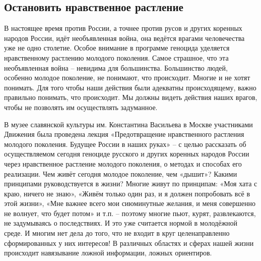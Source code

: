  
 
 
 
 
 
\subsection{Остановить нравственное растление}
\label{sec:19_05_2019.sites.ru.rusichi_info.1.ostanovit_nravstvennoje_rastlenije}

В настоящее время против России, а точнее против русов и других коренных
народов России, идёт необъявленная война, она ведётся врагами человечества уже
не одно столетие. Особое внимание в программе геноцида уделяется нравственному
растлению молодого поколения. Самое страшное, что эта необъявленная война –
невидима для большинства. Большинство людей, особенно молодое поколение, не
понимают, что происходит. Многие и не хотят понимать. Для того чтобы наши
действия были адекватны происходящему, важно правильно понимать, что
происходит. Мы должны видеть действия наших врагов, чтобы не позволять им
осуществлять задуманное. 

В музее славянской культуры им. Константина Васильева
в Москве участниками Движения была проведена лекция «Предотвращение
нравственного растления молодого поколения. Будущее России в наших руках» – с
целью рассказать об осуществляемом сегодня геноциде русского и других коренных
народов России через нравственное растление молодого поколения, о методах и
способах его реализации. Чем живёт сегодня молодое поколение, чем «дышит»?
Какими принципами руководствуется в жизни? Многие живут по принципам: «Моя хата
с краю, ничего не знаю», «Живём только один раз, и я должен попробовать всё в
этой жизни», «Мне важнее всего мои сиюминутные желания, и меня совершенно не
волнует, что будет потом» и т.п. – поэтому многие пьют, курят, развлекаются, не
задумываясь о последствиях. И это уже считается нормой в молодёжной среде. И
многим нет дела до того, что не входит в круг целенаправленно сформированных у
них интересов! В различных областях и сферах нашей жизни происходит навязывание
ложной информации, ложных ориентиров. 

